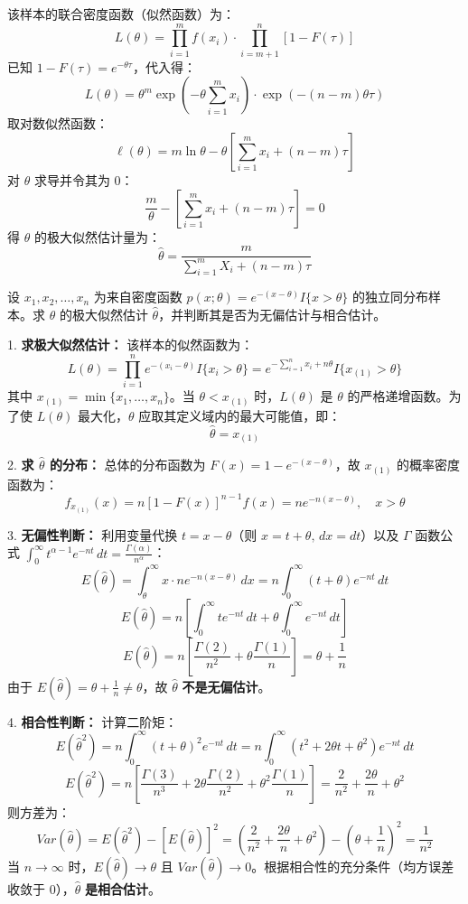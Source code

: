 \begin{questions}
\begin{solution}
该样本的联合密度函数（似然函数）为：
\[ L(\theta) = \prod_{i=1}^{m} f(x_i) \cdot \prod_{i=m+1}^{n} [1 - F(\tau)] \]
已知 $1 - F(\tau) = e^{-\theta \tau}$，代入得：
\[ L(\theta) = \theta^m \exp\left( -\theta \sum_{i=1}^m x_i \right) \cdot \exp\left( -(n-m)\theta \tau \right) \]
取对数似然函数：
\[ \ell(\theta) = m \ln \theta - \theta \left[ \sum_{i=1}^m x_i + (n-m)\tau \right] \]
对 $\theta$ 求导并令其为 $0$：
\[ \frac{m}{\theta} - \left[ \sum_{i=1}^m x_i + (n-m)\tau \right] = 0 \]
得 $\theta$ 的极大似然估计量为：
\[ \hat{\theta} = \frac{m}{\sum_{i=1}^m X_i + (n-m)\tau} \]
\end{solution}

\question 设 $x_1, x_2, \dots, x_n$ 为来自密度函数 $p(x; \theta) = e^{-(x-\theta)} I\{x > \theta\}$ 的独立同分布样本。求 $\theta$ 的极大似然估计 $\hat{\theta}$，并判断其是否为无偏估计与相合估计。

\begin{solution}
1. \textbf{求极大似然估计：}
该样本的似然函数为：
\[ L(\theta) = \prod_{i=1}^{n} e^{-(x_i-\theta)} I\{x_i > \theta\} = e^{-\sum_{i=1}^n x_i + n\theta} I\{x_{(1)} > \theta\} \]
其中 $x_{(1)} = \min\{x_1, \dots, x_n\}$。当 $\theta < x_{(1)}$ 时，$L(\theta)$ 是 $\theta$ 的严格递增函数。为了使 $L(\theta)$ 最大化，$\theta$ 应取其定义域内的最大可能值，即：
\[ \hat{\theta} = x_{(1)} \]

2. \textbf{求 $\hat{\theta}$ 的分布：}
总体的分布函数为 $F(x) = 1 - e^{-(x-\theta)}$，故 $x_{(1)}$ 的概率密度函数为：
\[ f_{x_{(1)}}(x) = n[1-F(x)]^{n-1}f(x) = n e^{-n(x-\theta)}, \quad x > \theta \]

3. \textbf{无偏性判断：}
利用变量代换 $t = x - \theta$（则 $x = t + \theta, \, dx = dt$）以及 $\Gamma$ 函数公式 $\int_{0}^{\infty} t^{\alpha-1} e^{-nt} \, dt = \frac{\Gamma(\alpha)}{n^\alpha}$：
\[ E(\hat{\theta}) = \int_{\theta}^{\infty} x \cdot n e^{-n(x-\theta)} \, dx = n \int_{0}^{\infty} (t + \theta) e^{-nt} \, dt \]
\[ E(\hat{\theta}) = n \left[ \int_{0}^{\infty} t e^{-nt} \, dt + \theta \int_{0}^{\infty} e^{-nt} \, dt \right] \]
\[ E(\hat{\theta}) = n \left[ \frac{\Gamma(2)}{n^2} + \theta \frac{\Gamma(1)}{n} \right] = \theta + \frac{1}{n} \]
由于 $E(\hat{\theta}) = \theta + \frac{1}{n} \neq \theta$，故 $\hat{\theta}$ \textbf{不是无偏估计}。

4. \textbf{相合性判断：}
计算二阶矩：
\[ E(\hat{\theta}^2) = n \int_{0}^{\infty} (t + \theta)^2 e^{-nt} \, dt = n \int_{0}^{\infty} (t^2 + 2\theta t + \theta^2) e^{-nt} \, dt \]
\[ E(\hat{\theta}^2) = n \left[ \frac{\Gamma(3)}{n^3} + 2\theta \frac{\Gamma(2)}{n^2} + \theta^2 \frac{\Gamma(1)}{n} \right] = \frac{2}{n^2} + \frac{2\theta}{n} + \theta^2 \]
则方差为：
\[ Var(\hat{\theta}) = E(\hat{\theta}^2) - [E(\hat{\theta})]^2 = \left( \frac{2}{n^2} + \frac{2\theta}{n} + \theta^2 \right) - \left( \theta + \frac{1}{n} \right)^2 = \frac{1}{n^2} \]
当 $n \to \infty$ 时，$E(\hat{\theta}) \to \theta$ 且 $Var(\hat{\theta}) \to 0$。根据相合性的充分条件（均方误差收敛于 $0$），$\hat{\theta}$ \textbf{是相合估计}。
\end{solution}


\end{questions}
